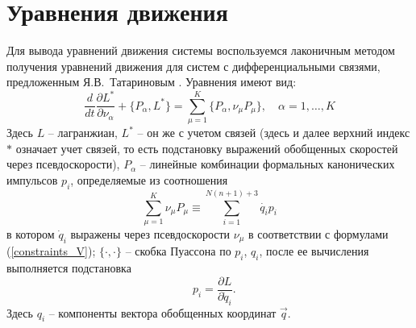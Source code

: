 \section{Уравнения движения}\label{sect:eqs}


Для вывода уравнений движения системы воспользуемся лаконичным методом получения уравнений движения для систем с дифференциальными связями, предложенным Я.В.~Татариновым \cite{Tatarinov,Zobova2011}. Уравнения имеют вид:
\begin{equation}\label{Tatarinov}
    \frac{d}{dt}\frac{\partial L^{*}}{\partial \nu_\alpha}  + \{P_\alpha, L^{*}\} = \sum\limits_{\mu = 1}^{K}\{P_\alpha, \nu_\mu P_\mu\},\quad \alpha = 1,\dots, K
\end{equation}
Здесь $L$ -- лагранжиан, $L^*$ -- он же с учетом связей (здесь и далее верхний индекс $*$ означает учет связей, то есть подстановку выражений обобщенных скоростей через псевдоскорости), $P_\alpha$ -- линейные комбинации формальных канонических импульсов $p_i$, определяемые из соотношения
\begin{equation}\label{eq:tatimp}
    \sum\limits_{\mu=1}^{K}\nu_\mu P_\mu \equiv \sum\limits_{i=1}^{N(n+1)+3}\dot{q_i} p_i
\end{equation}
в котором $\dot{q}_i$ выражены через псевдоскорости $\nu_\mu$ в соответствии с формулами (\ref{constraints_V}); $\{\cdot, \cdot\}$ -- скобка Пуассона по $p_i$, $q_i$, после ее вычисления выполняется подстановка 
$$
    \hspace{10pt} p_i = \frac{\partial L}{\partial \dot{q}_i}.
$$
Здесь $q_i$ -- компоненты вектора обобщенных координат $\vec{q}$.

